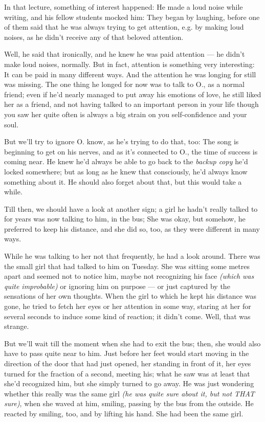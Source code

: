 In that lecture, something of interest happened: He made a loud noise while writing, and his fellow students mocked him: They began by laughing, before one of them said that he was always trying to get attention, e.g. by making loud noises, as he didn't receive any of that beloved attention.

Well, he said that ironically, and he knew he was paid attention --- he didn't make loud noises, normally. 
But in fact, attention is something very interesting: It can be paid in many different ways. And the attention he was longing for still was missing. 
The one thing he longed for now was to talk to O., as a normal friend; even if he'd nearly managed to put away his emotions of love, he still liked her as a friend, and not having talked to an important person in your life though you saw her quite often is always a big strain on you self-confidence and your soul.

But we'll try to ignore O. know, as he's trying to do that, too: The song is beginning to get on his nerves, and as it's connected to O., the time of success is coming near. 
He knew he'd always be able to go back to the \emph{backup copy} he'd locked somewhere; but as long as he knew that consciously, he'd always know something about it. He should also forget about that, but this would take a while.

Till then, we should have a look at another sign; a girl he hadn't really talked to for years was now talking to him, in the bus; She was okay, but somehow, he preferred to keep his distance, and she did so, too, as they were different in many ways.

While he was talking to her not that frequently, he had a look around. There was the small girl that had talked to him on Tuesday. She was sitting some metres apart and seemed not to notice him, maybe not recognizing his face \emph{(which was quite improbable)} or ignoring him on purpose --- or just captured by the sensations of her own thoughts. 
When the girl to which he kept his distance was gone, he tried to fetch her eyes or her attention in some way, staring at her for several seconds to induce some kind of reaction; it didn't come. 
Well, that was strange.

But we'll wait till the moment when she had to exit the bus; then, she would also have to pass quite near to him. Just before her feet would start moving in the direction of the door that had just opened, her standing in front of it, her eyes turned for the fraction of a second, meeting his; what he saw was at least that she'd recognized him, but she simply turned to go away. He was just wondering whether this really was the same girl \emph{(he was quite sure about it, but not THAT sure)}, when she waved at him, smiling, passing by the bus from the outside. He reacted by smiling, too, and by lifting his hand. 
She had been the same girl.

